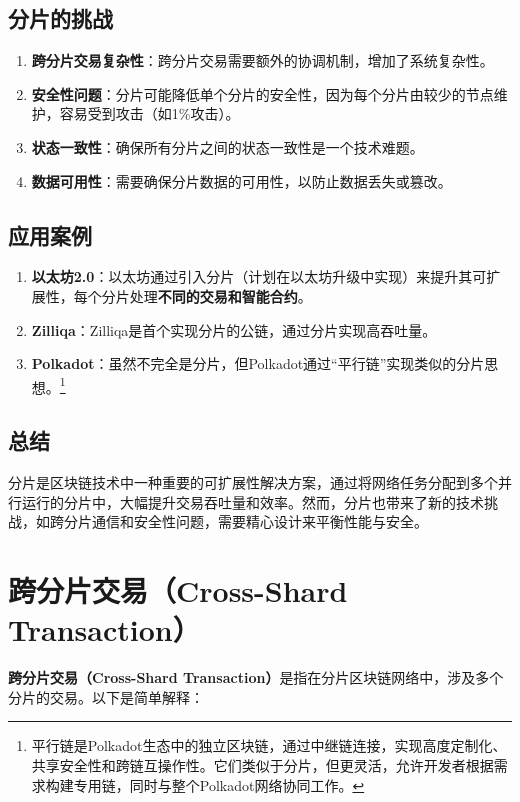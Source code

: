 \documentclass[12pt]{ctexart}
\begin{document}
\subsection{分片的挑战}
\begin{enumerate}
  \item \textbf{跨分片交易复杂性}：跨分片交易需要额外的协调机制，增加了系统复杂性。
  \item \textbf{安全性问题}：分片可能降低单个分片的安全性，因为每个分片由较少的节点维护，容易受到攻击（如1\%攻击）。
  \item \textbf{状态一致性}：确保所有分片之间的状态一致性是一个技术难题。
  \item \textbf{数据可用性}：需要确保分片数据的可用性，以防止数据丢失或篡改。
\end{enumerate}

\subsection{应用案例}
\begin{enumerate}
  \item \textbf{以太坊2.0}：以太坊通过引入分片（计划在以太坊升级中实现）来提升其可扩展性，每个分片处理\textbf{不同的交易和智能合约}。
  \item \textbf{Zilliqa}：Zilliqa是首个实现分片的公链，通过分片实现高吞吐量。
  \item \textbf{Polkadot}：虽然不完全是分片，但Polkadot通过“平行链”实现类似的分片思想。\footnote{平行链是Polkadot生态中的独立区块链，通过中继链连接，实现高度定制化、共享安全性和跨链互操作性。它们类似于分片，但更灵活，允许开发者根据需求构建专用链，同时与整个Polkadot网络协同工作。}
\end{enumerate}

\subsection{总结}
分片是区块链技术中一种重要的可扩展性解决方案，通过将网络任务分配到多个并行运行的分片中，大幅提升交易吞吐量和效率。然而，分片也带来了新的技术挑战，如跨分片通信和安全性问题，需要精心设计来平衡性能与安全。

\newpage
\section{跨分片交易（Cross-Shard Transaction）}
\textbf{跨分片交易（Cross-Shard Transaction）}是指在分片区块链网络中，涉及多个分片的交易。以下是简单解释：
\end{document}
